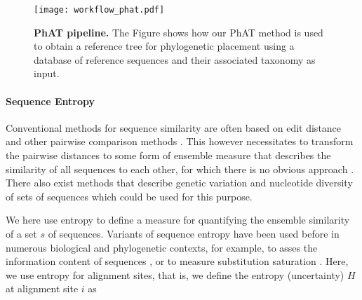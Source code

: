 \begin{figure}[hpbt]
    \centering
    \texttt{[image: workflow\_phat.pdf]}
    \caption[PhAT pipeline]{
        \textbf{PhAT pipeline.}
        The Figure shows how our PhAT method is used to obtain a reference tree for phylogenetic placement
        using a database of reference sequences and their associated taxonomy as input.
    }
    \label{fig:workflow_phat}
\end{figure}



\paragraph{Sequence Entropy}
\label{ch:AutomaticTrees:sec:Methods:sub:PhAT:par:SequenceEntropy}

Conventional methods for sequence similarity are often based on edit distance
and other pairwise comparison methods \cite{Needleman1970,Smith1981,Altschul1990}.
This however necessitates to transform the pairwise distances to some form of ensemble measure
that describes the similarity of all sequences to each other, for which there is no obvious approach \cite{Zhou2006}.
There also exist methods that describe genetic variation and
nucleotide diversity of sets of sequences \cite{Nei1979,Blaisdell1986} which could be used for this purpose.

We here use entropy \cite{Shannon1951} to define a measure
for quantifying the ensemble similarity of a set $s$ of sequences.
Variants of sequence entropy have been used before in numerous biological and phylogenetic contexts,
for example, to asses the information content of sequences
\cite{Schmitt1997,Vinga2003,Vinga2004,Li2005,Criscuolo2010,Comin2012,Vinga2014},
or to measure substitution saturation \cite{Xia2003}.
Here, we use entropy for alignment sites, that is, we define the entropy (uncertainty) $H$ at alignment site $i$ as

